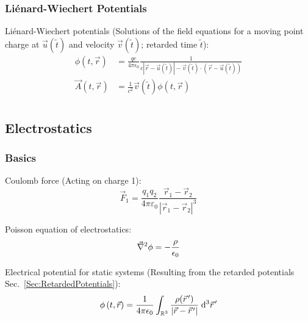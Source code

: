 		\subsubsection{Liénard-Wiechert Potentials}
			\noindent
			Liénard-Wiechert potentials (Solutions of the field equations for a moving point charge at $\vec{u}(\tilde{t})$ and velocity $\vec{v}(\tilde{t})$; retarded time $\tilde{t}$):
			\begin{equation}
				\begin{aligned}
					\phi(t,\vec{r}) & =\frac{q c}{4\pi \epsilon_0}\frac{1}{c \left|\vec{r}-\vec{u}(\tilde{t})\right|-\vec{v}(\tilde{t})\cdot\left(\vec{r}-\vec{u}(\tilde{t})\right)} \\
					\vec{A}(t,\vec{r}) &= \frac{1}{c^2}\vec{v}(\tilde{t})\phi(t,\vec{r}) \\
				\end{aligned}
			\end{equation}

	\subsection{Electrostatics}
		\subsubsection{Basics}
			\noindent
			Coulomb force (Acting on charge 1):
			\begin{equation}
				\vec{F}_1 = \frac{q_1 q_2}{4\pi\varepsilon_0}\frac{\vec{r}_1-\vec{r}_2}{\left|\vec{r}_1-\vec{r}_2\right|^3}
			\end{equation}

			\noindent
			Poisson equation of electrostatics:
			\begin{equation}
				\vec{\nabla}^2\phi = -\frac{\rho}{\epsilon_0}
				\label{Eq:Poisson}
			\end{equation}

			\noindent
			Electrical potential for static systems (Resulting from the retarded potentials Sec.~\ref{Sec:RetardedPotentials}):
			\begin{equation}
				\phi\left(t,\vec{r}\right)
				= \frac{1}{4\pi\epsilon_0} \int_{\mathbb{R}^3} \frac{\rho(\pvec{r}')}{\left|\vec{r}-\pvec{r}'\right|}\;\dd^3 \pvec{r}'
			\end{equation}

